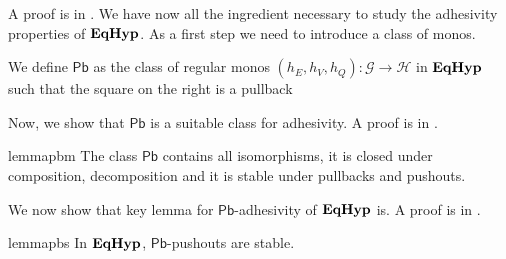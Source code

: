 \documentclass[a4paper,UKenglish,cleveref,pdftex,thm-restate,numberwithinsect]{lipics-v2021}
\newcommand{\pbc}{\mathsf{Pb}}
\newcommand{\catname}[1]{\textbf{\textup{#1}}}
\newcommand{\EqHyp}{\catname{EqHyp}} %
\begin{document}
A proof is in .
We have now all the ingredient necessary to study the adhesivity properties of $\EqHyp$.  As a first step we need to introduce a class of monos.

\noindent
\parbox{10cm}{
\begin{definition}
	We define $\pbc$ as the class of  regular monos $(h_E, h_V, h_Q)\colon \mathcal{G}\to \mathcal{H}$ in $\EqHyp$ such that the square on the right is a pullback
\end{definition}
} \hfill
	\parbox{2cm}{
         }   

Now, we show that $\pbc$ is a suitable class for adhesivity. A proof is in .

\begin{restatable}{lemma}{pbm}\label{lem:pbmono}
	The class $\pbc$ contains all isomorphisms, it is closed under composition, decomposition and it is stable under pullbacks and pushouts.
\end{restatable}

We now show that key lemma for $\pbc$-adhesivity of $\EqHyp$ is. A proof is in .

\begin{restatable}{lemma}{pbs}\label{lemma:stab}
	In $\EqHyp$, $\pbc$-pushouts are stable.
\end{restatable}
\end{document}
